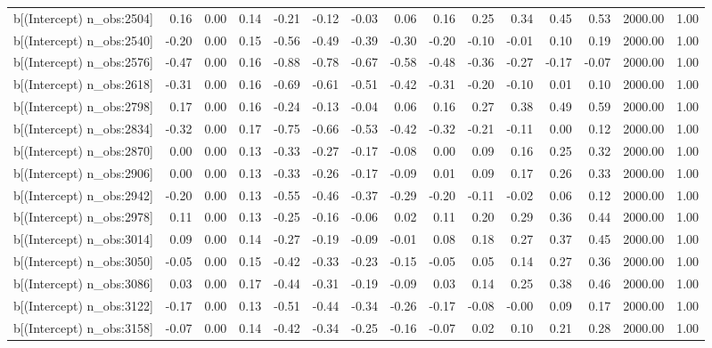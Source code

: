 \begin{table}[ht]
\begin{tabular}{rrrrrrrrrrrrrrr}
  b[(Intercept) n\_obs:2504] & 0.16 & 0.00 & 0.14 & -0.21 & -0.12 & -0.03 & 0.06 & 0.16 & 0.25 & 0.34 & 0.45 & 0.53 & 2000.00 & 1.00 \\ 
  b[(Intercept) n\_obs:2540] & -0.20 & 0.00 & 0.15 & -0.56 & -0.49 & -0.39 & -0.30 & -0.20 & -0.10 & -0.01 & 0.10 & 0.19 & 2000.00 & 1.00 \\ 
  b[(Intercept) n\_obs:2576] & -0.47 & 0.00 & 0.16 & -0.88 & -0.78 & -0.67 & -0.58 & -0.48 & -0.36 & -0.27 & -0.17 & -0.07 & 2000.00 & 1.00 \\ 
  b[(Intercept) n\_obs:2618] & -0.31 & 0.00 & 0.16 & -0.69 & -0.61 & -0.51 & -0.42 & -0.31 & -0.20 & -0.10 & 0.01 & 0.10 & 2000.00 & 1.00 \\ 
  b[(Intercept) n\_obs:2798] & 0.17 & 0.00 & 0.16 & -0.24 & -0.13 & -0.04 & 0.06 & 0.16 & 0.27 & 0.38 & 0.49 & 0.59 & 2000.00 & 1.00 \\ 
  b[(Intercept) n\_obs:2834] & -0.32 & 0.00 & 0.17 & -0.75 & -0.66 & -0.53 & -0.42 & -0.32 & -0.21 & -0.11 & 0.00 & 0.12 & 2000.00 & 1.00 \\ 
  b[(Intercept) n\_obs:2870] & 0.00 & 0.00 & 0.13 & -0.33 & -0.27 & -0.17 & -0.08 & 0.00 & 0.09 & 0.16 & 0.25 & 0.32 & 2000.00 & 1.00 \\ 
  b[(Intercept) n\_obs:2906] & 0.00 & 0.00 & 0.13 & -0.33 & -0.26 & -0.17 & -0.09 & 0.01 & 0.09 & 0.17 & 0.26 & 0.33 & 2000.00 & 1.00 \\ 
  b[(Intercept) n\_obs:2942] & -0.20 & 0.00 & 0.13 & -0.55 & -0.46 & -0.37 & -0.29 & -0.20 & -0.11 & -0.02 & 0.06 & 0.12 & 2000.00 & 1.00 \\ 
  b[(Intercept) n\_obs:2978] & 0.11 & 0.00 & 0.13 & -0.25 & -0.16 & -0.06 & 0.02 & 0.11 & 0.20 & 0.29 & 0.36 & 0.44 & 2000.00 & 1.00 \\ 
  b[(Intercept) n\_obs:3014] & 0.09 & 0.00 & 0.14 & -0.27 & -0.19 & -0.09 & -0.01 & 0.08 & 0.18 & 0.27 & 0.37 & 0.45 & 2000.00 & 1.00 \\ 
  b[(Intercept) n\_obs:3050] & -0.05 & 0.00 & 0.15 & -0.42 & -0.33 & -0.23 & -0.15 & -0.05 & 0.05 & 0.14 & 0.27 & 0.36 & 2000.00 & 1.00 \\ 
  b[(Intercept) n\_obs:3086] & 0.03 & 0.00 & 0.17 & -0.44 & -0.31 & -0.19 & -0.09 & 0.03 & 0.14 & 0.25 & 0.38 & 0.46 & 2000.00 & 1.00 \\ 
  b[(Intercept) n\_obs:3122] & -0.17 & 0.00 & 0.13 & -0.51 & -0.44 & -0.34 & -0.26 & -0.17 & -0.08 & -0.00 & 0.09 & 0.17 & 2000.00 & 1.00 \\ 
  b[(Intercept) n\_obs:3158] & -0.07 & 0.00 & 0.14 & -0.42 & -0.34 & -0.25 & -0.16 & -0.07 & 0.02 & 0.10 & 0.21 & 0.28 & 2000.00 & 1.00 \\ 

\end{tabular}
\end{table}
